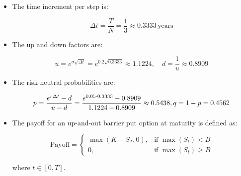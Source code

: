\begin{itemize}
    \item The time increment per step is:
    
    \[
    \Delta t = \frac{T}{N} = \frac{1}{3} \approx 0.3333 \, \text{years}
    \]

    \item The up and down factors are:
    
    \[
    u = e^{\sigma \sqrt{\Delta t}} = e^{0.2 \sqrt{0.3333}} \approx 1.1224, \quad d = \frac{1}{u} \approx 0.8909
    \]

    \item The risk-neutral probabilities are:
    
    \[
    p = \frac{e^{r \Delta t} - d}{u - d} = \frac{e^{0.05 \cdot 0.3333} - 0.8909}{1.1224 - 0.8909} \approx 0.5438, \\ q = 1 - p = 0.4562
    \]

    \item The payoff for an up-and-out barrier put option at maturity is defined as:

    \[ 
    \text{Payoff} = 
    \begin{cases} 
    \max(K - S_T, 0), & \text{if } \max(S_t) < B \\ 
    0, & \text{if } \max(S_t) \geq B 
    \end{cases}
    \]

    where \(t \in [0, T]\).
    
\end{itemize}


